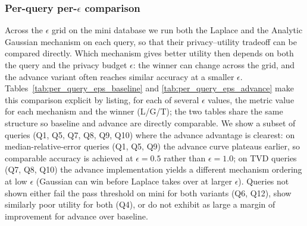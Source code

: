 \documentclass[12pt,letterpaper]{article}
\begin{document}
\subsubsection{Per-query per-$\epsilon$ comparison}
\small
Across the $\epsilon$ grid on the mini database we run both the Laplace and the Analytic Gaussian mechanism on each query, so that their privacy--utility tradeoff can be compared directly. Which mechanism gives better utility then depends on both the query and the privacy budget $\epsilon$: the winner can change across the grid, and the advance variant often reaches similar accuracy at a smaller $\epsilon$. Tables~\ref{tab:per_query_eps_baseline} and \ref{tab:per_query_eps_advance} make this comparison explicit by listing, for each of several $\epsilon$ values, the metric value for each mechanism and the winner (L/G/T); the two tables share the same structure so baseline and advance are directly comparable. We show a subset of queries (Q1, Q5, Q7, Q8, Q9, Q10) where the advance advantage is clearest: on median-relative-error queries (Q1, Q5, Q9) the advance curve plateaus earlier, so comparable accuracy is achieved at $\epsilon = 0.5$ rather than $\epsilon = 1.0$; on TVD queries (Q7, Q8, Q10) the advance implementation yields a different mechanism ordering at low $\epsilon$ (Gaussian can win before Laplace takes over at larger $\epsilon$). Queries not shown either fail the pass threshold on mini for both variants (Q6, Q12), show similarly poor utility for both (Q4), or do not exhibit as large a margin of improvement for advance over baseline.
\end{document}
